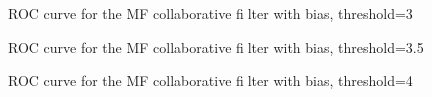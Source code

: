\documentclass{article}
\begin{document}
\begin{figure}
\centering
{}
\caption{ROC curve for the MF collaborative filter with bias, threshold=3} \label{Q292}
\end{figure}

\begin{figure}
\centering
{}
\caption{ROC curve for the MF collaborative filter with bias, threshold=3.5} \label{Q293}
\end{figure}

\begin{figure}
\centering
{}
\caption{ROC curve for the MF collaborative filter with bias, threshold=4} \label{Q294}
\end{figure}
\end{document}

